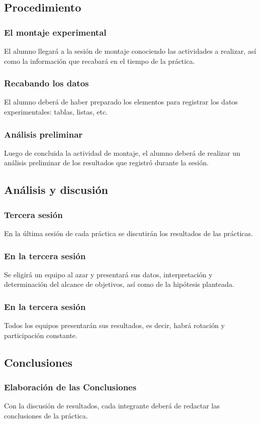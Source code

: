 \documentclass[14pt]{beamer}
\begin{document}
\subsection{Procedimiento}

\begin{frame}
\frametitle{El montaje experimental}
El alumno llegará a la sesión de montaje conociendo las actividades a realizar, \pause así como la información que recabará en el tiempo de la práctica.
\end{frame}
\begin{frame}
\frametitle{Recabando los datos}
El alumno deberá de haber preparado los elementos para registrar los datos experimentales: tablas, listas, etc.
\end{frame}
\begin{frame}
\frametitle{Análisis preliminar}
Luego de concluida la actividad de montaje, el alumno deberá de realizar un análisis preliminar de los resultados que registró durante la sesión.
\end{frame}

\subsection{Análisis y discusión}

\begin{frame}
\frametitle{Tercera sesión}
En la última sesión de cada práctica se discutirán los resultados de las prácticas.

\end{frame}
\begin{frame}
\frametitle{En la tercera sesión}
Se eligirá un equipo al azar y presentará sus datos, interpretación y determinación del alcance de objetivos, así como de la hipótesis planteada.
\end{frame}
\begin{frame}
\frametitle{En la tercera sesión}
Todos los equipos presentarán sus resultados, es decir, habrá rotación y participación constante.
\end{frame}

\subsection{Conclusiones}

\begin{frame}
\frametitle{Elaboración de las Conclusiones}
Con la discusión de resultados, cada integrante deberá de redactar las conclusiones de la práctica.
\end{frame}
\end{document}
